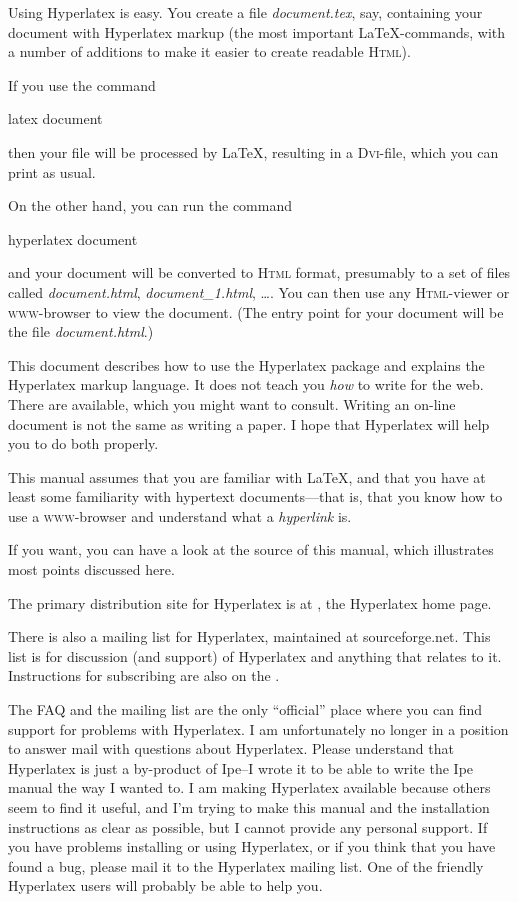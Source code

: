 \documentclass{article}
\newcommand{\+}{\verb+}
\renewcommand{\*}{\back{}}
\newcommand{\Html}{\textsc{Html}\xspace }
\newcommand{\latex}{\LaTeX\xspace }
\newcommand{\dvi}{\textsc{Dvi}\xspace }
\begin{document}
Using Hyperlatex is easy. You create a file \textit{document.tex},
say, containing your document with Hyperlatex markup (the most
important \latex-commands, with a number of additions to make it
easier to create readable \Html).

If you use the command
\begin{example}
  latex document
\end{example}
then your file will be processed by \latex, resulting in a
\dvi-file, which you can print as usual.

On the other hand, you can run the command
\begin{example}
  hyperlatex document
\end{example}
and your document will be converted to \Html format, presumably to a
set of files called \textit{document.html}, \textit{document\_1.html},
\ldots{}. You can then use any \Html-viewer or \textsc{www}-browser to
view the document.  (The entry point for your document will be the
file \textit{document.html}.)

This document describes how to use the Hyperlatex package and explains
the Hyperlatex markup language. It does not teach you {\em how} to
write for the web. There are 
available, which you might want to consult. Writing an on-line
document is not the same as writing a paper. I hope that Hyperlatex
will help you to do both properly.

This manual assumes that you are familiar with \latex, and that you
have at least some familiarity with hypertext documents---that is,
that you know how to use a \textsc{www}-browser and understand what a
\emph{hyperlink} is.

If you want, you can have a look at the source of this manual, which
illustrates most points discussed here.

The primary distribution site for Hyperlatex is at
,
the Hyperlatex home page.

There is also a mailing list for Hyperlatex, maintained at
sourceforge.net.  This list is for discussion (and support) of Hyperlatex and
anything that relates to it.  Instructions for subscribing are also on
the .

The FAQ and the mailing list are the only ``official'' place where you
can find support for problems with Hyperlatex.  I am unfortunately no
longer in a position to answer mail with questions about Hyperlatex.
Please understand that Hyperlatex is just a by-product of Ipe--I wrote
it to be able to write the Ipe manual the way I wanted to. I am making
Hyperlatex available because others seem to find it useful, and I'm
trying to make this manual and the installation instructions as clear
as possible, but I cannot provide any personal support.  If you have
problems installing or using Hyperlatex, or if you think that you have
found a bug, please mail it to the Hyperlatex mailing list.
One of the friendly Hyperlatex users will probably be able to help
you.
\end{document}
